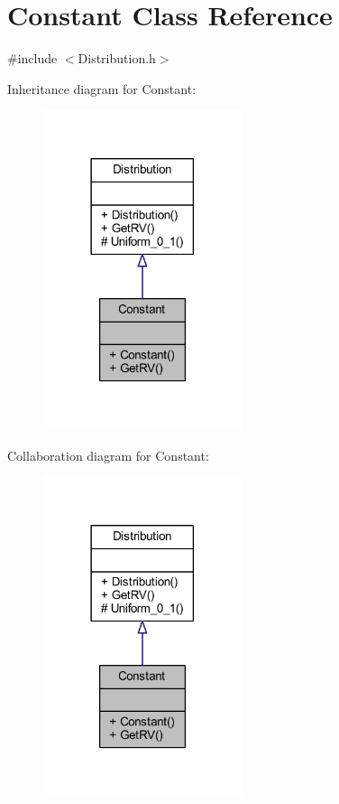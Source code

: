 \hypertarget{class_constant}{}\section{Constant Class Reference}
\label{class_constant}


{\ttfamily \#include $<$Distribution.\+h$>$}



Inheritance diagram for Constant\+:
\nopagebreak
\begin{figure}[H]
\begin{center}
\leavevmode
\includegraphics[width=165pt]{class_constant__inherit__graph}
\end{center}
\end{figure}


Collaboration diagram for Constant\+:
\nopagebreak
\begin{figure}[H]
\begin{center}
\leavevmode
\includegraphics[width=165pt]{class_constant__coll__graph}
\end{center}
\end{figure}
